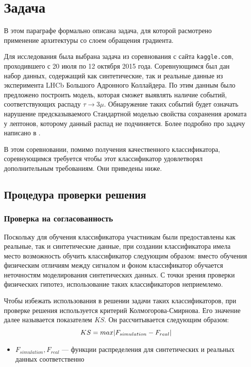 \documentclass[14pt, a4paper]{extarticle}
\DeclarePairedDelimiter{\abs}{\lvert}{\rvert}
\begin{document}
\section{Задача}
\label{paragraph:task}

В этом параграфе формально описана задача, для которой расмотрено применение архитектуры со слоем обращения градиента.

Для исследования была выбрана задача из соревнования \cite{kaggle_contest} с сайта \texttt{kaggle.com}, проходившего с 20 июля по 12 октября 2015 года. Соревнующимся был дан набор данных, содержащий как синтетические, так и реальные данные из эксперимента LHCb Большого Адронного Коллайдера. По этим данным было предложено построить модель, которая сможет выявлять наличие событий, соответствующих распаду $\tau \rightarrow 3\mu$. Обнаружение таких событий будет означать нарушение предсказываемого Стандартной моделью свойства сохранения аромата у лептонов, которому данный распад не подчиняется. Более подробно про задачу написано в \cite{kaggle}.

В этом соревновании, помимо получения качественного классификатора, соревнующимся требуется чтобы этот классификатор удовлетворял дополнительным требованиям. Они приведены ниже.

\subsection*{Процедура проверки решения}

\subsubsection*{Проверка на согласованность}
\label{agreement_metrics}
Поскольку для обучения классификатора участникам были предоставлены как реальные, так и синтетические данные, при создании классификатора имела место возможность обучить классификатор следующим образом: вместо обучения физическим отличиям между сигналом и фоном классификатор обучается неточностям моделирования синтетических данных. С точки зрения проверки физических гипотез, использование таких классификаторов неприемлемо. 

Чтобы избежать использования в решении задачи таких классификаторов, при проверке решения используется критерий Колмогорова-Смирнова. Его значение далее называется показателем $KS$. Он рассчитывается следующим образом:
\begin{equation*}
	KS = max \abs{F_{simulation} - F_{real}}
\end{equation*}
\begin{itemize}
	\item $F_{simulation}, F_{real}$ — функции распределения для синтетических и реальных данных соответственно
\end{itemize}
\end{document}
